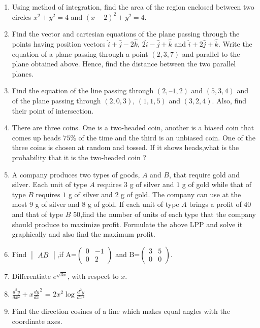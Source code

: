 \documentclass[12pt,-letter paper]{article}
\providecommand{\brak}[1]{\ensuremath{\left(#1\right)}}
\theoremstyle{remark}
\newcommand{\myvec}[1]{\ensuremath{\begin{pmatrix}#1\end{pmatrix}}}
\newcommand{\mydet}[1]{\ensuremath{\begin{vmatrix}#1\end{vmatrix}}}
\begin{document}
\begin{enumerate}
        \item Using method of integration, find the area of the region enclosed between two circles ${x^2+y^2=4}$ and $\brak{x-2}^2+{y^2}=4$.
        
        \item Find the vector and cartesian equations of the plane passing through the points having position vectors $\hat{i}+\hat{j}-2\hat{k}$, $2\hat{i}-\hat{j}+\hat{k}$ and $\hat{i}+2\hat{j}+\hat{k}$. Write the equation of a plane passing through a point \brak{2, 3, 7} and parallel to the plane obtained above. Hence, find the distance between the two parallel planes.
        
        \item Find the equation of the line passing through \brak{2, – 1, 2} and \brak{5, 3, 4} and of the plane passing through \brak{2, 0, 3}, \brak{1, 1, 5} and \brak{3, 2, 4}. Also, find their point of intersection.

\item There are three coins. One is a two-headed coin, another is a biased coin that comes up heads $75\%$ of the time and the third is an unbiased coin. One of the three coins is chosen at random and tossed. If it shows heads,what is the probability that it is the two-headed coin ?

\item A company produces two types of goods, $A$ and $B$, that require gold and silver. Each unit of type $A$ requires $3$ g of silver and $1$ g of gold while that of type $B$ requires $1$ g of silver and $2$ g of gold. The company can use at the most $9$ g of silver and $8$ g of gold. If each unit of type $A$ brings a profit of \rupee $40$ and that of type $B$ \rupee $50$,find the number of units of each type that the company should produce to maximize profit. Formulate the above LPP and solve it graphically and also find the maximum profit.

\item Find $\mydet{AB}$,if A=$\myvec{0&-1 \\ 0&2}$ and B=$\myvec{3&5 \\ 0&0}$.

\item Differentiate $e^{\sqrt{3x}}$, with respect to ${x}$.

\item $\frac{d^2y}{dx^2}+x{\frac{dy}{dx}}^2$ = $2x^2\log\frac{d^2y}{dx^2}$

\item Find the direction cosines of a line which makes equal angles with the
coordinate axes.


\end{enumerate}
\end{document}

